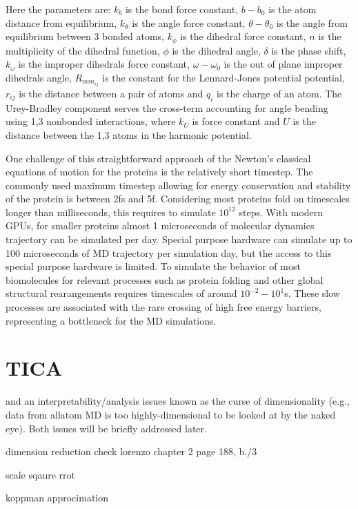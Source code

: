 Here the parameters are: $k_b$ is the bond force constant, $b-b_0$ is the atom distance from equilibrium, $k_\theta$ is the angle force constant, $\theta-\theta_0$ is the angle from equilibrium between 3 bonded atoms, $k_\phi$ is the dihedral force constant, $n$ is the multiplicity of the dihedral function, $\phi$ is the dihedral angle, $\delta$ is the phase shift, $k_\omega$ is the improper dihedrals force constant, $\omega-\omega_0$ is the out of plane improper dihedrals angle, $R_{{min}_{ij}}$ is the constant for the Lennard-Jones potential potential, $r_{ij}$ is the distance between a pair of atoms and $q_{i}$ is the charge of an atom. The Urey-Bradley component serves the cross-term accounting for angle bending using 1,3 nonbonded interactions, where $k_U$ is force constant and $U$ is the distance between the 1,3 atoms in the harmonic potential.

One challenge of this straightforward approach of the Newton's classical equations of motion for the proteins is the relatively short timestep. The commonly used maximum timestep allowing for energy conservation and stability of the protein is between 2fs and 5f. Considering most proteins fold on timescales longer than milliseconds, this requires to simulate $10^{12}$ steps. With modern GPUs, for smaller proteins almost 1 microseconds of molecular dynamics trajectory can be simulated per day. Special purpose hardware \cite{shaw2014anton} can simulate up to 100 microseconds of MD trajectory per simulation day, but the access to this special purpose hardware is limited. To simulate the behavior of most biomolecules for relevant processes such as protein folding and other global structural rearangements requires timescales of around $10^{-2} - 10^{1}$s. These slow processes are associated with the rare crossing of high free energy barriers, representing a bottleneck for the MD simulations.

\section{TICA}

and an
interpretability/analysis issues known as the curse of dimensionality (e.g., data from allatom
MD is too highly-dimensional to be looked at by the naked eye). Both issues will be
briefly addressed later.


dimension reduction
check  lorenzo chapter 2
page 188, b./3

scale sqaure rrot

koppman approcimation


